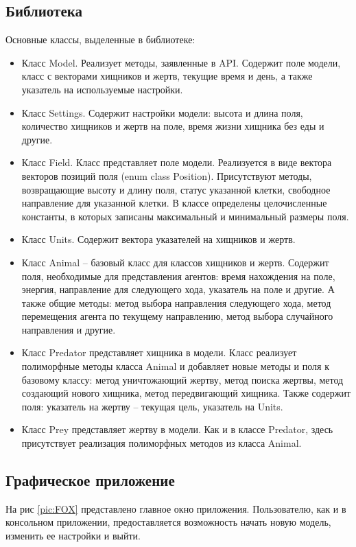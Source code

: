 \documentclass[a4paper]{article}
\begin{document}
\subsection{Библиотека}
\noindent Основные классы, выделенные в библиотеке:
\begin{itemize}
\item Класс Model. Реализует методы, заявленные  в API. Содержит поле модели, класс с векторами хищников и жертв, текущие время и день, а также указатель на используемые настройки.
\item Класс Settings. Содержит настройки модели: высота и длина поля, количество хищников и жертв на поле, время жизни хищника без еды и другие. 
\item Класс Field. Класс представляет поле модели. Реализуется в виде вектора векторов позиций поля (enum class Position). Присутствуют методы, возвращающие высоту и длину поля, статус указанной клетки, свободное направление для указанной клетки. В классе определены целочисленные константы, в которых записаны максимальный и минимальный размеры поля. 
\item Класс Units. Содержит вектора указателей на хищников и жертв.
\item Класс Animal – базовый класс для классов хищников и жертв. Содержит поля, необходимые для представления агентов: время нахождения на поле, энергия, направление для следующего хода, указатель на поле и другие. А также общие методы: метод выбора направления следующего хода, метод перемещения агента по текущему направлению,  метод выбора случайного направления и другие. 
\item Класс Predator представляет хищника в модели. Класс реализует полиморфные методы класса Animal и добавляет новые методы и поля к базовому классу: метод уничтожающий жертву, метод поиска жертвы, метод создающий нового хищника, метод передвигающий хищника. Также содержит поля: указатель на жертву – текущая цель, указатель на Units.
\item Класс Prey представляет жертву в модели. Как и в классе Predator, здесь присутствует реализация полиморфных методов из класса Animal. 
\end{itemize}

\subsection{Графическое приложение}
На рис \ref{pic:FOX} представлено главное окно приложения. Пользователю, как и в консольном приложении, предоставляется возможность начать новую модель, изменить ее настройки и выйти. 
\end{document}

